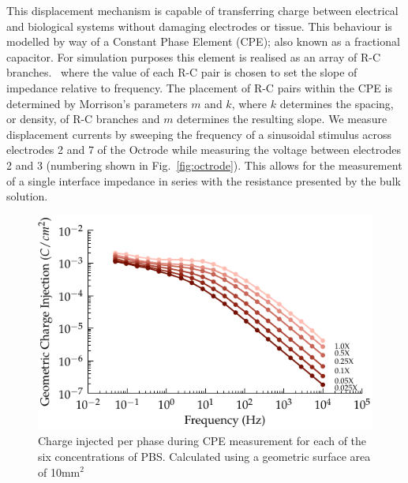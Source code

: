 \documentclass[journal, a4paper]{IEEEtran}
\begin{document}
This displacement mechanism is capable of transferring charge between electrical and biological systems without damaging electrodes or tissue.\cite{Horch2004}
This behaviour is modelled by way of a Constant Phase Element (CPE); also known as a fractional capacitor.
For simulation purposes this element is realised as an array of R-C branches.~\cite{ScottSingle2013,Morrison59,Elwakil10} where the value of each R-C pair is chosen to set the slope of impedance relative to frequency. The placement of R-C pairs within the CPE is determined by Morrison's parameters $m$ and $k$, where $k$ determines the spacing, or density, of R-C branches and $m$ determines the resulting slope.
We measure displacement currents by sweeping the frequency of a sinusoidal stimulus across electrodes 2 and 7 of the Octrode while measuring the voltage between electrodes 2 and 3 (numbering shown in Fig.~\ref{fig:octrode}).
This allows for the measurement of a single interface impedance in series with the resistance presented by the bulk solution.
\begin{figure}
    \begin{center}
        \includegraphics{graphics/chargeInjectionVsFrequency_magnitude}
    \end{center}
    \caption{Charge injected per phase during CPE measurement for each of the six concentrations of PBS. Calculated using a geometric surface area of 10\thinspace mm$^{2}$}
    \label{fig:chargeInjectionVsFrequency}
\end{figure}
\end{document}
